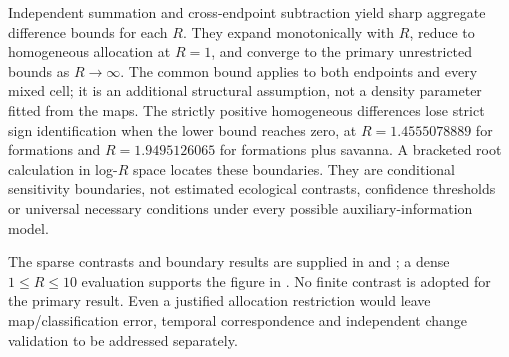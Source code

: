 Independent summation and cross-endpoint subtraction yield sharp aggregate difference bounds for each $R$. They expand monotonically with $R$, reduce to homogeneous allocation at $R=1$, and converge to the primary unrestricted bounds as $R\to\infty$. The common bound applies to both endpoints and every mixed cell; it is an additional structural assumption, not a density parameter fitted from the maps. The strictly positive homogeneous differences lose strict sign identification when the lower bound reaches zero, at $R=1.4555078889$ for formations and $R=1.9495126065$ for formations plus savanna. A bracketed root calculation in log-$R$ space locates these boundaries. They are conditional sensitivity boundaries, not estimated ecological contrasts, confidence thresholds or universal necessary conditions under every possible auxiliary-information model.



The sparse contrasts and boundary results are supplied in  and ; a dense $1\le R\le10$ evaluation supports the figure in . No finite contrast is adopted for the primary result. Even a justified allocation restriction would leave map/classification error, temporal correspondence and independent change validation to be addressed separately.

